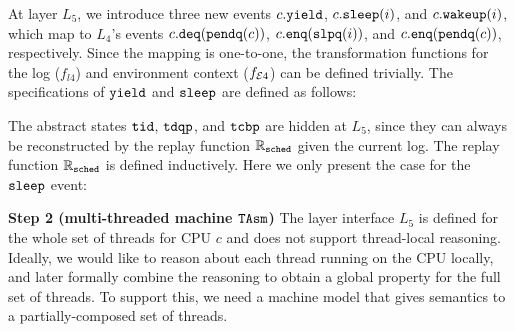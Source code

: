 {At layer $L_5$, we introduce three new events
$c.\yield$, $c.\sleep(i)$, and $c.\wakeup(i)$,
which map to $L_4$'s events
$c.\deq(\comm{pendq}(c))$,
$c.\enq(\comm{slpq}(i))$,
and $c.\enq(\comm{pendq}(c))$, respectively.
Since the mapping is one-to-one, the transformation functions for
the log ($f_{l4}$) and environment context ($f_{\oracle4}$)
can be defined trivially.
The specifications of $\yield$ and $\sleep$
are defined as follows:
\begin{small}
\begin{mathpar}
\end{mathpar}
\end{small}%
The abstract states $\comm{tid}$,
$\comm{tdqp}$, and $\comm{tcbp}$
are hidden at $L_5$, since they can always be reconstructed
by the replay function $\replay_{\comm{sched}}$ given the current log.
The replay function $\replay_{\comm{sched}}$
is defined inductively.
Here we only present the case for the $\sleep$ event:
\begin{small}
\begin{mathpar}
\end{mathpar}
\end{small}%
\noindent\textbf{Step 2 (multi-threaded machine $\TAsm$)} 
The  layer interface $L_5$ is defined for the whole
set of threads for CPU $c$ and does not support thread-local reasoning.
Ideally, we would like to reason about each thread running on the CPU 
locally, and later formally combine the reasoning to obtain a global
property for the full set of threads.
To support this, we need a machine model that gives semantics to
a partially-composed set of threads.

}
